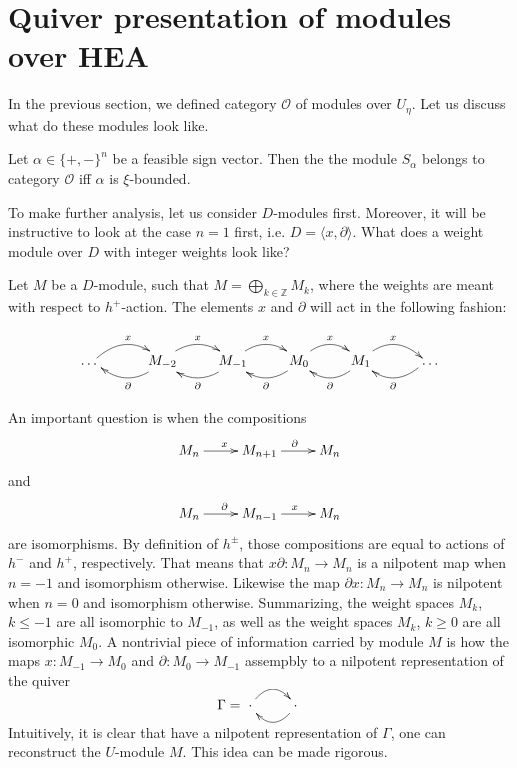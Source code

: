 \newpage
\section{Quiver presentation of modules over HEA} %

In the previous section, we defined category $\mathcal{O}$ of modules over $U_\eta$. Let us discuss what do these modules look like. 

\begin{example}
Let $\alpha\in\{+,-\}^n$ be a feasible sign vector. Then the the module $S_\alpha$ belongs to category $\mathcal{O}$ iff $\alpha$ is $\xi$-bounded.
\end{example}

To make further analysis, let us consider $D$-modules first. Moreover, it will be instructive to look at the case $n=1$ first, i.e. $D=\langle x, \partial\rangle$. What does a weight module over $D$ with integer weights look like?

Let $M$ be a $D$-module, such that $M=\bigoplus_{k\in \mathbb{Z}} M_k$, where the weights are meant with respect to $h^+$-action. The elements $x$ and $\partial$ will act in the following fashion:

\begin{equation}
\xymatrix{
\dots~~ \ar@/^1.0pc/@[black][r]^{x}
  & M_{-2}   \ar@/^1.0pc/@[black][l]^{\partial} \ar@/^1.0pc/@[black][r]^{x}
  & M_{-1}  \ar@/^1.0pc/@[black][l]^{\partial} \ar@/^1.0pc/@[black][r]^{x}
  & M_0 \ar@/^1.0pc/@[black][l]^{\partial}
  \ar@/^1.0pc/@[black][r]^{x}
  & M_1 \ar@/^1.0pc/@[black][l]^{\partial}
  \ar@/^1.0pc/@[black][r]^{x} 
  & ~~\dots \ar@/^1.0pc/@[black][l]^{\partial}
  }
\end{equation}

An important question is when the compositions $$\xymatrix{M_n\ar[r]^{x}& M_{n+1}\ar[r]^{\partial}& M_{n}}$$ and $$\xymatrix{M_n\ar[r]^{\partial}& M_{n-1}\ar[r]^{x}& M_{n}}$$ are isomorphisms. By definition of $h^\pm$, those compositions are equal to actions of $h^-$ and $h^+$, respectively. That means that $x\partial:{M_n\to M_{n}}$ is a nilpotent map when $n=-1$ and isomorphism otherwise. Likewise the map $\partial x:{M_n\to M_{n}}$ is nilpotent when $n=0$ and isomorphism otherwise. Summarizing, the weight spaces $M_k$, $k\le-1$ are all isomorphic to $M_{-1}$, as well as the weight spaces $M_k$, $k\ge0$ are all isomorphic $M_0$. A nontrivial piece of information carried by module $M$ is how the maps $x:M_{-1}\to M_0$ and $\partial:M_0\to M_{-1}$ assempbly to a nilpotent representation of the quiver
$$
\Gamma = \xymatrix{\cdot \ar@/^1.0pc/@[black][r]
  & \cdot  \ar@/^1.0pc/@[black][l]}
$$
Intuitively, it is clear that have a nilpotent representation of $\Gamma$, one can reconstruct the $U$-module $M$. This idea can be made rigorous.

